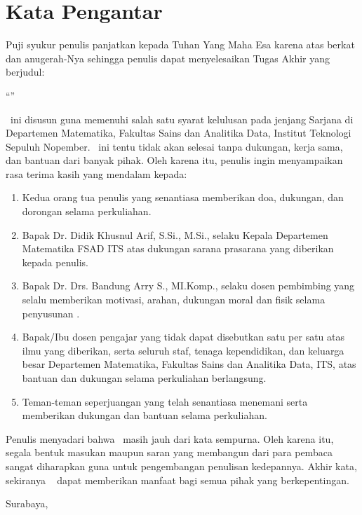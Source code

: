 \chapter*{Kata Pengantar}
Puji syukur penulis panjatkan kepada Tuhan Yang Maha Esa karena atas berkat dan anugerah-Nya sehingga penulis dapat menyelesaikan Tugas Akhir yang berjudul:
\begin{center}
    \makeatletter
    ``\noindent\MakeUppercase{\@judul}''
    \makeatother
\end{center}

\noindent \Ta~ini disusun guna memenuhi salah satu syarat kelulusan pada jenjang Sarjana di Departemen Matematika, Fakultas Sains dan Analitika Data, Institut Teknologi Sepuluh Nopember. \Ta~ini tentu tidak akan selesai tanpa dukungan, kerja sama, dan bantuan dari banyak pihak. Oleh karena itu, penulis ingin menyampaikan rasa terima kasih yang mendalam kepada:
%
\begin{enumerate}
    \item Kedua orang tua penulis yang senantiasa memberikan doa, dukungan, dan dorongan selama perkuliahan.
    \item Bapak Dr. Didik Khusnul Arif, S.Si., M.Si., selaku Kepala Departemen Matematika FSAD ITS atas dukungan sarana prasarana yang diberikan kepada penulis.
    \item Bapak Dr. Drs. Bandung Arry S., MI.Komp., selaku dosen pembimbing yang selalu memberikan motivasi, arahan, dukungan moral dan fisik selama penyusunan \ta.
    \item Bapak/Ibu dosen pengajar yang tidak dapat disebutkan satu per satu atas ilmu yang diberikan, serta seluruh staf, tenaga kependidikan, dan keluarga besar Departemen Matematika, Fakultas Sains dan Analitika Data, ITS, atas bantuan dan dukungan selama perkuliahan berlangsung.
    \item Teman-teman seperjuangan yang telah senantiasa menemani serta memberikan dukungan dan bantuan selama perkuliahan.
\end{enumerate}

Penulis menyadari bahwa \ta~masih jauh dari kata sempurna. Oleh karena itu, segala bentuk masukan maupun saran yang membangun dari para pembaca sangat diharapkan guna untuk pengembangan penulisan kedepannya. Akhir kata, sekiranya \ta~ dapat memberikan manfaat bagi semua pihak yang berkepentingan.

\makeatletter
\begin{flushright}
    Surabaya, \ \@tanggal\ \@bulan\ \@tahun

    \vspace{2cm}
    \@nama
\end{flushright}
\makeatother